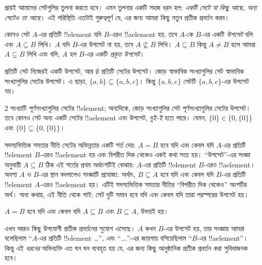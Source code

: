 \documentclass[../../../include/open-logic-section]{subfiles}
\begin{document}

\begin{explain}
প্রায়ই আমাদের সেটগুলির তুলনা করতে হবে। এমন তুলনার একটি সহজ ধরন হল:
\emph{একটি সেটে যা কিছু আছে, অন্য সেটেও তা আছে}। এই পরিস্থিতি এতটাই
গুরুত্বপূর্ণ যে, এর জন্য আমরা কিছু নতুন প্রতীক প্রবর্তন করব।
\end{explain}

\begin{defn}[উপসেট]
কোনও সেট $A$-এর প্রতিটি !!{element} যদি $B$-এরও !!a{element} হয়,
তবে $A$-কে $B$-এর একটি \emph{উপসেট} বলি এবং $A \subseteq B$ লিখি।
$A$ যদি $B$-এর উপসেট না হয়, তবে $A \not\subseteq B$ লিখি।
$A \subseteq B$ কিন্তু $A \neq B$ হলে আমরা $A \subsetneq B$ লিখি
এবং বলি, $A$ হল $B$-এর একটি \emph{প্রকৃত উপসেট}।
\end{defn}

\begin{ex}
প্রতিটি সেট নিজেরই একটি উপসেট, আর $\emptyset$ প্রতিটি সেটের উপসেট।
জোড় স্বাভাবিক সংখ্যাগুলির সেট স্বাভাবিক সংখ্যাগুলির সেটের উপসেট।
এ ছাড়া, $\{ a, b \} \subseteq \{ a, b, c \}$। কিন্তু
$\{ a, b, e \}$ সেটটি $\{ a, b, c \}$-এর উপসেট নয়।
\end{ex}

\begin{ex}
$2$ সংখ্যাটি পূর্ণসংখ্যাগুলির সেটের !!{element}; অন্যদিকে, জোড় সংখ্যাগুলির
সেট পূর্ণসংখ্যাগুলির সেটের উপসেট। তবে কোনও সেট অন্য একটি সেটের
!!a{element} এবং উপসেট, \emph{দুই-ই} হতে পারে। যেমন,
$\{0\} \in \{0, \{0\}\}$ এবং $\{0\} \subseteq \{0, \{0\}\}$।
\end{ex}

সদস্যভিত্তিক সমতার নীতি সেটের অভিন্নতার একটি শর্ত দেয়: $A = B$ হবে
যদি এবং কেবল যদি $A$-এর প্রতিটি !!{element} $B$-এরও !!a{element} হয়
এবং বিপরীত দিক থেকেও একই কথা সত্য হয়। ``উপসেট''-এর সংজ্ঞা অনুযায়ী
$A \subseteq B$ ঠিক এই শর্তের প্রথম অর্ধাংশটিই বোঝায়:
$A$-এর প্রতিটি !!{element} $B$-এরও !!a{element}। অবশ্য $A$ ও $B$-এর
স্থান বদলালেও সংজ্ঞাটি প্রযোজ্য: অর্থাৎ, $B \subseteq A$ হবে যদি এবং
কেবল যদি $B$-এর প্রতিটি !!{element} $A$-এরও !!a{element} হয়।
এটিই সদস্যভিত্তিক সমতার নীতির ``বিপরীত দিক থেকেও'' অংশটির অর্থ।
অন্য কথায়, এই নীতি থেকে পাই: সেট দুটি সমান হবে যদি এবং কেবল যদি
তারা পরস্পরের উপসেট হয়।

\begin{prop}
$A = B$ হবে যদি এবং কেবল যদি $A \subseteq B$ এবং $B \subseteq A$, উভয়ই হয়।
\end{prop}

এখন আরও কিছু উপযোগী প্রতীক প্রবর্তনের সুযোগ এসেছে। $A$ কখন $B$-এর
উপসেট হয়, তার সংজ্ঞায় আমরা বলেছিলাম ``$A$-এর প্রতিটি !!{element}
\dots'', এবং ``$\dots$''-এর জায়গায় বসিয়েছিলাম ``$B$-এর
!!a{element}''। কিন্তু এই \emph{ধরনের} অভিব্যক্তি এত ঘন ঘন ব্যবহৃত হয়
যে, এর জন্য কিছু আনুষ্ঠানিক প্রতীক প্রবর্তন করা সুবিধাজনক হবে।
\end{document}
